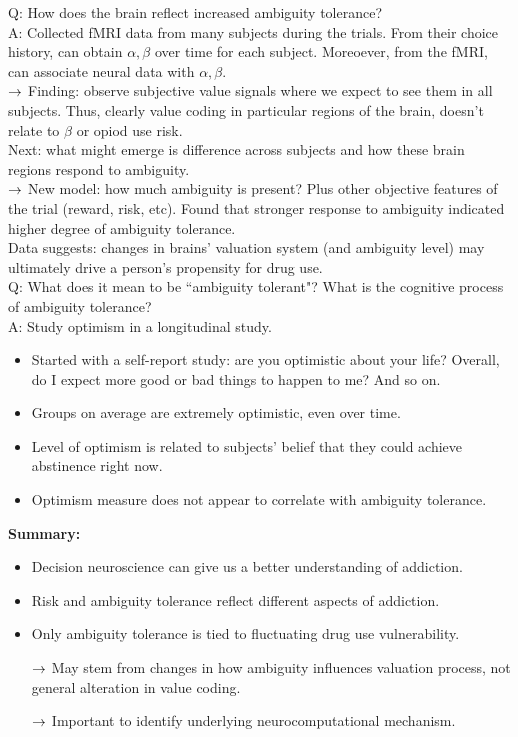 Q: How does the brain reflect increased ambiguity tolerance? \\

A: Collected fMRI data from many subjects during the trials. From their choice history, can obtain $\alpha, \beta$ over time for each subject. Moreoever, from the fMRI, can associate neural data with $\alpha, \beta$. \\

$\rightarrow$ Finding: observe subjective value signals where we expect to see them in all subjects. Thus, clearly value coding in particular regions of the brain, doesn't relate to $\beta$ or opiod use risk. \\

Next: what might emerge is difference across subjects and how these brain regions respond to ambiguity. \\

$\rightarrow$ New model: how much ambiguity is present? Plus other objective features of the trial (reward, risk, etc). Found that stronger response to ambiguity indicated higher degree of ambiguity tolerance. \\

Data suggests: changes in brains' valuation system (and ambiguity level) may ultimately drive a person's propensity for drug use. \\

Q: What does it mean to be ``ambiguity tolerant"? What is the cognitive process of ambiguity tolerance? \\

A: Study optimism in a longitudinal study.
\begin{itemize}
    \item Started with a self-report study: are you optimistic about your life? Overall, do I expect more good or bad things to happen to me? And so on.
    \item Groups on average are extremely optimistic, even over time. 
    \item Level of optimism is related to subjects' belief that they could achieve abstinence right now.
    \item  Optimism measure does not appear to correlate with ambiguity tolerance.
\end{itemize}


{\bf Summary:}
\begin{itemize}
    \item Decision neuroscience can give us a better understanding of addiction.
    \item Risk and ambiguity tolerance reflect different aspects of addiction.
    \item Only ambiguity tolerance is tied to fluctuating drug use vulnerability.
    
    $\rightarrow$ May stem from changes in how ambiguity influences valuation process, not general alteration in value coding.
    
    $\rightarrow$ Important to identify underlying neurocomputational mechanism.
\end{itemize}

